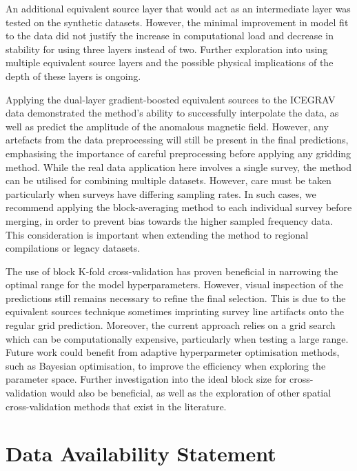 An additional equivalent source layer that would act as an intermediate layer was tested on the synthetic datasets. However, the minimal improvement in model fit to the data did not justify the increase in computational load and decrease in stability for using three layers instead of two. Further exploration into using multiple equivalent source layers and the possible physical implications of the depth of these layers is ongoing.

Applying the dual-layer gradient-boosted equivalent sources to the ICEGRAV data demonstrated the method’s ability to successfully interpolate the data, as well as predict the amplitude of the anomalous magnetic field. However, any artefacts from the data preprocessing will still be present in the final predictions, emphasising the importance of careful preprocessing before applying any gridding method. While the real data application here involves a single survey, the method can be utilised for combining multiple datasets. However, care must be taken particularly when surveys have differing sampling rates. In such cases, we recommend applying the block-averaging method to each individual survey before merging, in order to prevent bias towards the higher sampled frequency data. This consideration is important when extending the method to regional compilations or legacy datasets.

The use of block K-fold cross-validation has proven beneficial in narrowing the optimal range for the model hyperparameters. However, visual inspection of the predictions still remains necessary to refine the final selection. This is due to the equivalent sources technique sometimes imprinting survey line artifacts onto the regular grid prediction. Moreover, the current approach relies on a grid search which can be computationally expensive, particularly when testing a large range. Future work could benefit from adaptive hyperparmeter optimisation methods, such as Bayesian optimisation, to improve the efficiency when exploring the parameter space. Further investigation into the ideal block size for cross-validation would also be beneficial, as well as the exploration of other spatial cross-validation methods that exist in the literature.



\section{Data Availability Statement}

